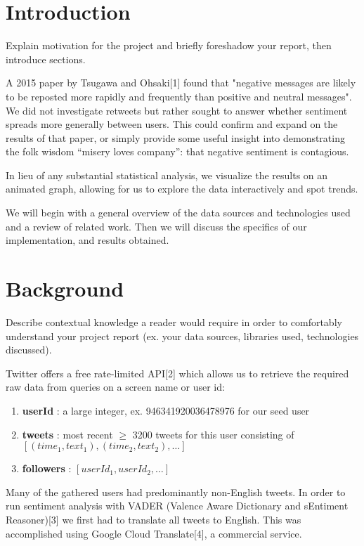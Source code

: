 \documentclass[12pt]{article}
\begin{document}
\section{Introduction}
Explain motivation for the project and briefly foreshadow your report, then introduce sections.\newline

A 2015 paper by Tsugawa and Ohsaki[1] found that "negative messages are likely to be reposted more rapidly and frequently than positive and neutral messages". We did not investigate retweets but rather sought to answer whether sentiment spreads more generally between users. This could confirm and expand on the results of that paper, or simply provide some useful insight into demonstrating the folk wisdom “misery loves company”: that negative sentiment is contagious.\newline

In lieu of any substantial statistical analysis, we visualize the results on an animated graph, allowing for us to explore the data interactively and spot trends.\newline

We will begin with a general overview of the data sources and technologies used and a review of related work. Then we will discuss the specifics of our implementation, and results obtained.


\section{Background}
Describe contextual knowledge a reader would require in order to comfortably understand your project report (ex. your data sources, libraries used, technologies discussed).\newline

Twitter offers a free rate-limited API[2] which allows us to retrieve the required raw data from queries on a screen name or user id:
\begin{enumerate}
    \item \textbf{userId} : a large integer, ex. 946341920036478976 for our seed user
    \item \textbf{tweets} : most recent $\geq$ 3200 tweets for this user consisting of $[(time_1, text_1), (time_2, text_2), \dots]$ 
    \item \textbf{followers} : $[userId_1, userId_2, \dots]$
\end{enumerate}

Many of the gathered users had predominantly non-English tweets. In order to run sentiment analysis with VADER (Valence Aware Dictionary and sEntiment Reasoner)[3] we first had to translate all tweets to English. This was accomplished using Google Cloud Translate[4], a commercial service.\newline
\end{document}

